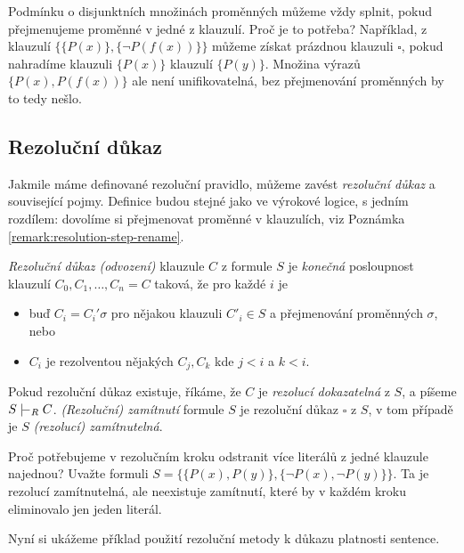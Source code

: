 \begin{remark}\label{remark:resolution-step-rename}
    Podmínku o disjunktních množinách proměnných můžeme vždy splnit, pokud přejmenujeme proměnné v jedné z klauzulí. Proč je to potřeba? Například, z klauzulí $\{\{P(x)\},\{\neg P(f(x))\}\}$ můžeme získat prázdnou klauzuli $\square$, pokud nahradíme klauzuli $\{P(x)\}$ klauzulí $\{P(y)\}$. Množina výrazů $\{P(x),P(f(x))\}$ ale není unifikovatelná, bez přejmenování proměnných by to tedy nešlo.
\end{remark}


\subsection{Rezoluční důkaz}

Jakmile máme definované rezoluční pravidlo, můžeme zavést \emph{rezoluční důkaz} a související pojmy. Definice budou stejné jako ve výrokové logice, s jedním rozdílem: dovolíme si přejmenovat proměnné v klauzulích, viz Poznámka \ref{remark:resolution-step-rename}.


\begin{definition}
    \emph{Rezoluční důkaz (odvození)} klauzule $C$ z formule $S$ je \emph{konečná} posloupnost klauzulí $C_0,C_1,\dots,C_n=C$
    taková, že pro každé $i$ je 
    \begin{itemize}
        \item buď $C_i=C_i'\sigma$ pro nějakou klauzuli $C'_i\in S$ a přejmenování proměnných $\sigma$, nebo
        \item $C_i$ je rezolventou nějakých $C_j,C_k$ kde $j<i$ a $k<i$.
    \end{itemize}
    Pokud rezoluční důkaz existuje, říkáme, že $C$ je \emph{rezolucí dokazatelná} z $S$, a píšeme $S\proves_R C$. \emph{(Rezoluční) zamítnutí} formule $S$ je rezoluční důkaz $\square$ z $S$, v tom případě je $S$ \emph{(rezolucí) zamítnutelná}.
\end{definition}

\begin{remark}
    Proč potřebujeme v rezolučním kroku odstranit více literálů z jedné klauzule najednou? Uvažte formuli $S=\{\{P(x),P(y)\},\{\neg P(x),\neg P(y)\}\}$. Ta je rezolucí zamítnutelná, ale neexistuje zamítnutí, které by v každém kroku eliminovalo jen jeden literál.
\end{remark}

Nyní si ukážeme příklad použití rezoluční metody k důkazu platnosti sentence.

